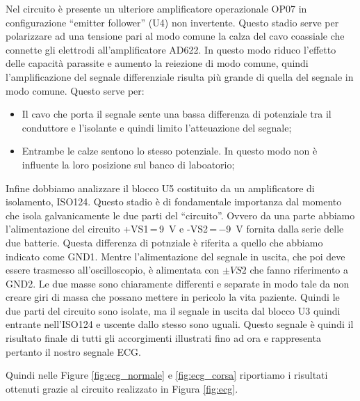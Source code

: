 Nel circuito è presente un ulteriore amplificatore operazionale OP07 in configurazione ``emitter follower'' (U4) non invertente. Questo stadio serve per polarizzare ad una tensione pari al modo comune la calza del cavo coassiale che connette gli elettrodi all'amplificatore AD622. In questo modo riduco l’effetto delle capacità parassite e aumento la reiezione di modo comune, quindi l'amplificazione del segnale differenziale risulta più grande di quella del segnale in modo comune. Questo serve per:

\begin{itemize}\itemsep0pt \parskip0pt 
	\item{Il cavo che porta il segnale sente una bassa differenza di potenziale tra il conduttore e l'isolante e quindi limito l'atteuazione del segnale;}
	\item{Entrambe le calze sentono lo stesso potenziale. In questo modo non è influente la loro posizione sul banco di laboatorio;}
\end{itemize}

Infine dobbiamo analizzare il blocco U5 costituito da un amplificatore di isolamento, ISO124. Questo stadio è di fondamentale importanza dal momento che isola galvanicamente le due parti del ``circuito''.
Ovvero da una parte abbiamo l'alimentazione del circuito +VS1\,=\,\SI{+9}{\volt} e -VS2\,=\,\SI{-9}{\volt} fornita dalla serie delle due batterie. Questa differenza di potnziale è riferita a quello che abbiamo indicato come GND1. Mentre l'alimentazione del segnale in uscita, che poi deve essere trasmesso all'oscilloscopio, è alimentata con $\pm VS2$  che fanno riferimento a GND2. Le due masse sono chiaramente differenti e separate in modo tale da non creare giri di massa che possano mettere in pericolo la vita paziente.
Quindi le due parti del circuito sono isolate, ma il segnale in uscita dal blocco U3 quindi entrante nell'ISO124 e uscente dallo stesso sono uguali. Questo segnale è quindi il risultato finale di tutti gli accorgimenti illustrati fino ad ora e rappresenta pertanto il nostro segnale ECG.

Quindi nelle Figure \ref{fig:ecg_normale} e \ref{fig:ecg_corsa} riportiamo i risultati ottenuti grazie al circuito realizzato in Figura \ref{fig:ecg}.

